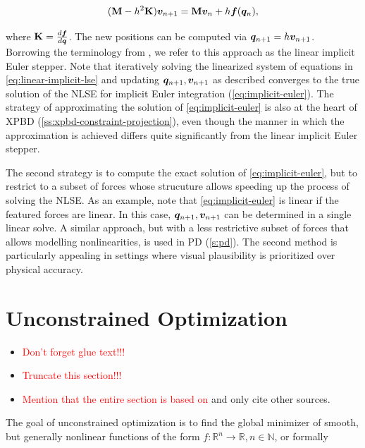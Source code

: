 \begin{equation}\label{eq:linear-implicit-stepper}
    (\mathbf{M} - h^2\mathbf{K})\bm{v}_{n+1} = \mathbf{M}\bm{v}_n + h\bm{f}(\bm{q}_n),
\end{equation}

\noindent where $\mathbf{K} = \frac{d\bm{f}}{d\bm{q}}$. The new positions can be computed via $\bm{q}_{n+1} = h \bm{v}_{n+1}$. 
Borrowing the terminology from \cite{servin2006}, we refer to this approach as the linear implicit Euler stepper. Note that iteratively solving
the linearized system of equations in \autoref{eq:linear-implicit-lse} and updating $\bm{q}_{n+1}, \bm{v}_{n+1}$ as described converges to 
the true solution of the NLSE for implicit Euler integration (\cref{eq:implicit-euler}). The strategy of approximating the solution of 
\autoref{eq:implicit-euler} is also at the heart of XPBD (\cref{ss:xpbd-constraint-projection}), even though the manner in which the 
approximation is achieved differs quite significantly from the linear implicit Euler stepper.

The second strategy is to compute the exact solution of \autoref{eq:implicit-euler}, but to restrict to a subset of forces whose strucuture 
allows speeding up the process of solving the NLSE. As an example, note that \autoref{eq:implicit-euler} is linear if the featured forces 
are linear. In this case, $\bm{q}_{n+1}, \bm{v}_{n+1}$ can be determined in a single linear solve. A similar approach, but with a less 
restrictive subset of forces that allows modelling nonlinearities, is used in PD (\cref{s:pd}). The second method is particularly appealing 
in settings where visual plausibility is prioritized over physical accuracy.

\section{Unconstrained Optimization}\label{s:unconstrained-optimization}
\begin{itemize}
    \item \textcolor{red}{Don't forget glue text!!!}
    \item \textcolor{red}{Truncate this section!!!}
    \item \textcolor{red}{Mention that the entire section is based on \cite{nocedal2006}} and only cite other sources.
\end{itemize}

The goal of unconstrained optimization is to find the global minimizer of smooth, but generally nonlinear functions of the form $f \colon 
\mathbb{R}^n \to \mathbb{R}, n \in \mathbb{N}$, or formally

